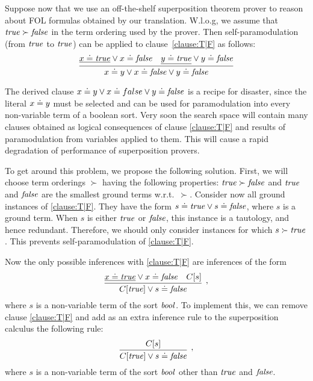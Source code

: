 Suppose now that we use an off-the-shelf superposition theorem prover to reason about FOL formulas obtained by our translation. W.l.o.g, we assume that $\mathit{true} \succ \mathit{false}$ in the term ordering used by the prover. Then self-paramodulation (from $\mathit{true}$ to $\mathit{true}$) can be applied to clause~\eqref{clause:T|F} as follows:
\[
\infer{x \eql y \vee x \eql \false \vee y \eql \false}%
{\underline{x \eql \true} \vee x \eql \false & \underline{y \eql \true} \vee y \eql \false}
\]

The derived clause $x \doteq y \vee x \doteq false \vee y \doteq \mathit{false}$ is a recipe for disaster, since the literal $x \doteq y$ must be selected and can be used for paramodulation into every non-variable term of a boolean sort. Very soon the search space will contain many clauses obtained as logical consequences of clause \eqref{clause:T|F} and results of paramodulation from variables applied to them. This will cause a rapid degradation of performance of superposition provers.

To get around this problem, we propose the following solution. First, we will choose term
orderings $\succ$ having the following properties: $\mathit{true}\succ\mathit{false}$ and $\mathit{true}$ and
$\mathit{false}$ are the smallest ground terms w.r.t.\ $\succ$. Consider now all ground instances of \eqref{clause:T|F}. They have the form $s \doteq \mathit{true} \vee s \doteq \mathit{false}$, where $s$ is a ground term. When $s$ is either $\mathit{true}$ or $\mathit{false}$, this instance is a tautology, and hence redundant. Therefore, we should only consider instances for which $s \succ \mathit{true}$. This prevents self-paramodulation of \eqref{clause:T|F}.

Now the only possible inferences with \eqref{clause:T|F} are inferences of the form
\[
\infer[,]{C[\true] \vee s \eql \false}%
{\underline{x \eql \true} \vee x \eql \false & C[s]}
\]
where $s$ is a non-variable term of the sort $\mathit{bool}$.
To implement this, we can remove clause \eqref{clause:T|F} and add as an extra inference rule to the superposition calculus the following rule:
\[
\infer[,]{C[\true] \vee s \eql \false}%
{C[s]}
\]
where $s$ is a non-variable term of the sort $\mathit{bool}$ other than $\mathit{true}$ and $\mathit{false}$.
